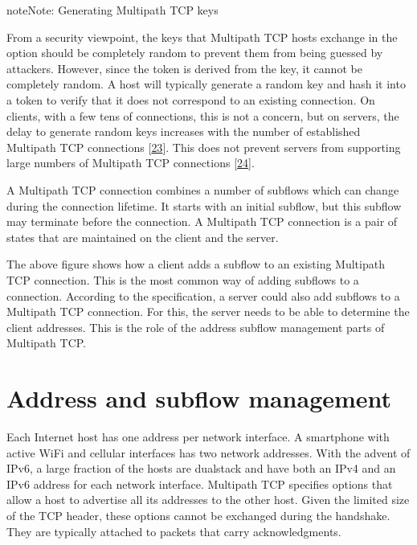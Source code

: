 \documentclass[letterpaper,10pt,english]{sphinxmanual}
\begin{document}
\begin{sphinxadmonition}{note}{Note:}
\sphinxAtStartPar
Generating Multipath TCP keys

\sphinxAtStartPar
From a security viewpoint, the keys that Multipath TCP hosts exchange in the  option should be completely random to prevent them from being guessed by attackers. However, since the token is derived from the key, it cannot be completely random. A host will typically generate a random key and hash it into a token to verify that it does not correspond to an existing connection. On clients, with a few tens of connections, this is not a concern, but on servers, the delay to generate random keys increases with the number of established Multipath TCP connections {[}\hyperlink{cite.biblio:id8941}{23}{]}. This does not prevent servers from supporting large numbers of Multipath TCP connections {[}\hyperlink{cite.biblio:id9001}{24}{]}.
\end{sphinxadmonition}

\sphinxAtStartPar
A Multipath TCP connection combines a number of subflows which can change during the connection lifetime. It starts with an initial subflow, but this subflow may terminate before the connection. A Multipath TCP connection is a pair of states that are maintained on the client and the server.

\sphinxAtStartPar
The above figure shows how a client adds a subflow to an existing Multipath TCP connection. This is the most common way of adding subflows to a connection. According to the specification, a server could also add subflows to a Multipath TCP connection. For this, the server needs to be able to determine the client addresses. This is the role of the address subflow management parts of Multipath TCP.


\section{Address and subflow management}
\label{\detokenize{mptcp:address-and-subflow-management}}\label{\detokenize{mptcp:mptcp-addr-management}}
\sphinxAtStartPar
Each Internet host has one address per network interface. A smartphone with active Wi\sphinxhyphen{}Fi and cellular interfaces has two network addresses. With the advent of IPv6, a large fraction of the hosts are dual\sphinxhyphen{}stack and have both an IPv4 and an IPv6 address for each network interface. Multipath TCP specifies options that allow a host to advertise all its addresses to the other host. Given the limited size of the TCP header, these options cannot be exchanged during the handshake. They are typically attached to packets that carry acknowledgments.
\end{document}
